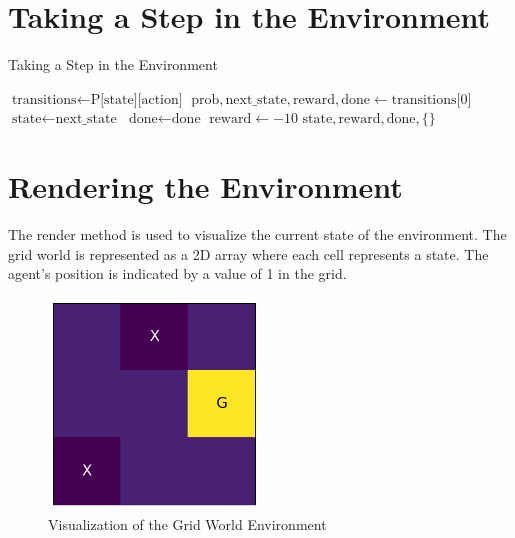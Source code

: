 \documentclass{article}
\begin{document}
\section{Taking a Step in the Environment}
\begin{algorithm}
\caption{Taking a Step in the Environment}\label{alg:step}
\begin{algorithmic}[1]
\State $\text{transitions} \gets \text{P[state][action]}$
\State $\text{prob}, \text{next\_state}, \text{reward}, \text{done} \gets \text{transitions[0]}$ 
\State $\text{state} \gets \text{next\_state}$
\State $\text{done} \gets \text{done}$
    \State $\text{reward} \gets -10$ 
\EndIf
\State \Return $\text{state}, \text{reward}, \text{done}, \{\}$
\end{algorithmic}
\end{algorithm}

\section{Rendering the Environment}
The render method is used to visualize the current state of the environment. The grid world is represented as a 2D array where each cell represents a state. The agent's position is indicated by a value of 1 in the grid.

\begin{figure}[htbp]
\centering
\includegraphics[width=0.5\textwidth]{gridworld.png}
\caption{Visualization of the Grid World Environment}\label{fig:gridworld}
\end{figure}
\end{document}
